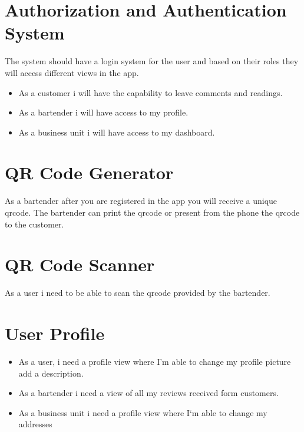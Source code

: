 \documentclass{scrreprt}
\begin{document}

\section{Authorization and Authentication System}
The system should have a login system for the user and based on
their roles they will access different views in the app.
\begin{itemize}
    \item As a customer i will have the capability to leave comments and readings.
    \item As a bartender i will have access to my profile.
    \item As a business unit i will have access to my dashboard.
\end{itemize}

\section{QR Code Generator}
As a bartender after you are registered in the app you will receive a unique qrcode.
The bartender can print the qrcode or present from the phone the qrcode to the customer.

\section{QR Code Scanner}
As a user i need to be able to scan the qrcode provided by the bartender.

\section{User Profile}
\begin{itemize}
    \item As a user, i need a profile view where I'm able to change my profile picture add a description.
    \item As a bartender i need a view of all my reviews received form customers.
    \item As a business unit i need a profile view where I`m able to change my addresses
\end{itemize}
\end{document}
